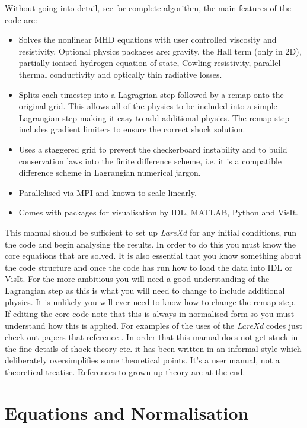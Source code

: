 \documentclass[11pt]{article}
\begin{document}
Without going into detail, see \cite{jcp} for complete algorithm, the main features of the code are:
\begin{itemize}
 \item Solves the nonlinear MHD equations with user controlled viscosity and resistivity. Optional 
 physics packages are: gravity, the Hall term (only in 2D), partially ionised hydrogen equation of state, 
 Cowling resistivity, parallel thermal conductivity and optically thin radiative losses.
 \item Splits each timestep into a Lagragrian step followed by a remap onto the original grid. This 
 allows all of the physics to be included into a simple Lagrangian step making it easy to add additional 
 physics. The remap step includes gradient limiters to ensure the correct shock solution.
 \item Uses a staggered grid to prevent the checkerboard instability and to build conservation laws 
 into the finite difference scheme, i.e. it is a compatible difference scheme in Lagrangian numerical jargon.
 \item Parallelised via MPI and known to scale linearly.
 \item Comes with packages for visualisation by IDL, MATLAB, Python and VisIt. \cite{visit}
\end{itemize}

This manual should be sufficient to set up {\it LareXd} for any initial conditions, run the code and 
begin analysing the results. In order to do this you must know the core equations that are solved. 
It is also essential that you know something about the code structure and once the code has run how 
to load the data into IDL or VisIt. For the more ambitious you will need a good understanding of the 
Lagrangian step as this is what you will need to change to include additional physics. It is unlikely 
you will ever need to know how to change the remap step. If editing the core code note that this is 
always in normalised form so you must understand how this is applied. For examples of the uses of the 
{\it LareXd} codes just check out papers that reference \cite{jcp}. In order that this manual does not 
get stuck in the fine details of shock theory etc. it has been written in an informal style which 
deliberately oversimplifies some theoretical points. It's a user manual, not a theoretical treatise. 
References to grown up theory are at the end.



\section{Equations and Normalisation}
\end{document}

